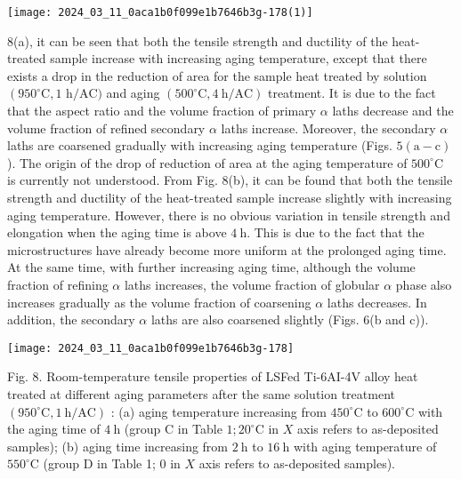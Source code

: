 \documentclass[10pt]{article}
\begin{document}
\begin{center}
\texttt{[image: 2024\_03\_11\_0aca1b0f099e1b7646b3g-178(1)]}
\end{center}

8(a), it can be seen that both the tensile strength and ductility of the heat-treated sample increase with increasing aging temperature, except that there exists a drop in the reduction of area for the sample heat treated by solution $\left(950^{\circ} \mathrm{C}, 1\right.$ $\mathrm{h} / \mathrm{AC})$ and aging $\left(500^{\circ} \mathrm{C}, 4 \mathrm{~h} / \mathrm{AC}\right)$ treatment. It is due to the fact that the aspect ratio and the volume fraction of primary $\alpha$ laths decrease and the volume fraction of refined secondary $\alpha$ laths increase. Moreover, the secondary $\alpha$ laths are coarsened gradually with increasing aging temperature (Figs. $5(\mathrm{a}-\mathrm{c})$ ). The origin of the drop of reduction of area at the aging temperature of $500^{\circ} \mathrm{C}$ is currently not understood. From Fig. 8(b), it can be found that both the tensile strength and ductility of the heat-treated sample increase slightly with increasing aging temperature. However, there is no obvious variation in tensile strength and elongation when the aging time is above $4 \mathrm{~h}$. This is due to the fact that the microstructures have already become more uniform at the prolonged aging time. At the same time, with further increasing aging time, although the volume fraction of refining $\alpha$ laths increases, the volume fraction of globular $\alpha$ phase also increases gradually as the volume fraction of coarsening $\alpha$ laths decreases. In addition, the secondary $\alpha$ laths are also coarsened slightly (Figs. 6(b and c)).

\begin{center}
\texttt{[image: 2024\_03\_11\_0aca1b0f099e1b7646b3g-178]}
\end{center}

Fig. 8. Room-temperature tensile properties of LSFed Ti-6AI-4V alloy heat treated at different aging parameters after the same solution treatment $\left(950^{\circ} \mathrm{C}, 1 \mathrm{~h} / \mathrm{AC}\right)$ : (a) aging temperature increasing from $450^{\circ} \mathrm{C}$ to $600^{\circ} \mathrm{C}$ with the aging time of $4 \mathrm{~h}$ (group $\mathrm{C}$ in Table $1 ; 20^{\circ} \mathrm{C}$ in $X$ axis refers to as-deposited samples); (b) aging time increasing from $2 \mathrm{~h}$ to $16 \mathrm{~h}$ with aging temperature of $550^{\circ} \mathrm{C}$ (group D in Table 1; 0 in $X$ axis refers to as-deposited samples).
\end{document}
